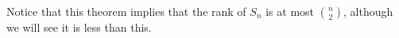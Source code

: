 \documentclass[fleqn]{NotesClass}
\begin{document}
    Notice that this theorem implies that the rank of \(S_n\) is at most \(\binom{n}{2}\), although we will see it is less than this.
    
    \appendixpage
    \begin{appendices}
        
        
    \end{appendices}
    
    \backmatter
    \renewcommand{\glossaryname}{Acronyms}
    \printglossary[acronym]
    \printindex
\end{document}
